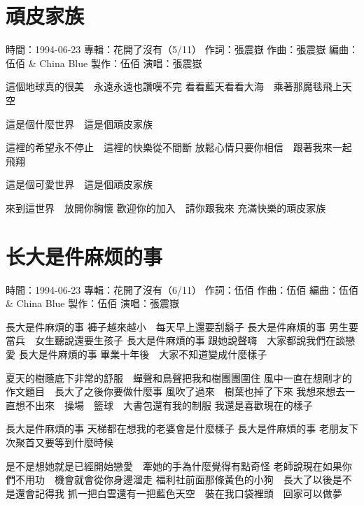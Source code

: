 \documentclass[UTF8,a4paper,oneside,twocolumn,12pt]{ctexbook}
\newcommand{\infopair}[2]{\textbullet #1：#2}
\newcommand{\zc}[1][伍佰]{\infopair{作詞}{#1}}
\newcommand{\zq}[1][伍佰]{\infopair{作曲}{#1}}
\newcommand{\bq}[1][伍佰]{\infopair{編曲}{#1}}
\newcommand{\zj}[1]{\infopair{專輯}{#1}}
\newcommand{\zz}[1]{\infopair{製作}{#1}}
\newcommand{\sj}[1]{\infopair{時間}{#1}}
\newenvironment{info}{\begin{flushleft}\kaishu
	}
	{\end{flushleft}\normalsize\yahei\par}
\newenvironment{lyric}{
	}
{}
\begin{document}
\section{頑皮家族}
\begin{info}
	\sj{1994-06-23}
	\zj{花開了沒有（5/11）}
	\zc[張震嶽]
	\zq[張震嶽]
	\bq[伍佰 \& China Blue]
	\zz{伍佰}
	\infopair{演唱}{張震嶽}
\end{info}
\begin{lyric}
	這個地球真的很美　永遠永遠也讚嘆不完
	看看藍天看看大海　乘著那魔毯飛上天空

	這是個什麼世界　這是個頑皮家族

	這裡的希望永不停止　這裡的快樂從不間斷
	放鬆心情只要你相信　跟著我來一起飛翔

	這是個可愛世界　這是個頑皮家族

	來到這世界　放開你胸懷
	歡迎你的加入　請你跟我來
	充滿快樂的頑皮家族
\end{lyric}

\section{长大是件麻烦的事}
\begin{info}
	\sj{1994-06-23}
	\zj{花開了沒有（6/11）}
	\zc
	\zq
	\bq[伍佰 \& China Blue]
	\zz{伍佰}
	\infopair{演唱}{張震嶽}
\end{info}
\begin{lyric}
	長大是件麻煩的事
	褲子越來越小　每天早上還要刮鬍子
	長大是件麻煩的事
	男生要當兵　女生聽說還要生孩子
	長大是件麻煩的事
	跟她說聲嗨　大家都說我們在談戀愛
	長大是件麻煩的事
	畢業十年後　大家不知道變成什麼樣子

	夏天的樹蔭底下非常的舒服　蟬聲和鳥聲把我和樹團團圍住
	風中一直在想剛才的作文題目　長大了之後你要做什麼事
	風吹了過來　樹葉也掉了下來
	我想來想去一直想不出來　操場　籃球　大書包還有我的制服
	我還是喜歡現在的樣子

	長大是件麻煩的事
	天梯都在想我的老婆會是什麼樣子
	長大是件麻煩的事
	老朋友下次聚首又要等到什麼時候

	是不是想她就是已經開始戀愛　牽她的手為什麼覺得有點奇怪
	老師說現在如果你們不用功　機會就會從你身邊溜走
	福利社前面那條黃色的小狗　長大了以後是不是還會記得我
	抓一把白雲還有一把藍色天空　裝在我口袋裡頭　回家可以做夢
\end{lyric}
\end{document}
